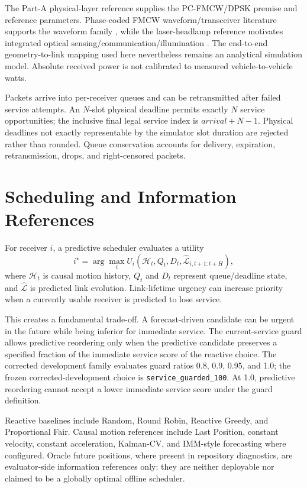 \documentclass[conference]{IEEEtran}
\begin{document}
The Part-A physical-layer reference supplies the PC-FMCW/DPSK premise and reference parameters. Phase-coded FMCW waveform/transceiver literature supports the waveform family \cite{kumbul2023smoothed,kumbul2023mimo}, while the laser-headlamp reference motivates integrated optical sensing/communication/illumination \cite{liu2026laserheadlamp}. The end-to-end geometry-to-link mapping used here nevertheless remains an analytical simulation model. Absolute received power is not calibrated to measured vehicle-to-vehicle watts.

Packets arrive into per-receiver queues and can be retransmitted after failed service attempts. An $N$-slot physical deadline permits exactly $N$ service opportunities; the inclusive final legal service index is $arrival+N-1$. Physical deadlines not exactly representable by the simulator slot duration are rejected rather than rounded. Queue conservation accounts for delivery, expiration, retransmission, drops, and right-censored packets.

\section{Scheduling and Information References}
For receiver $i$, a predictive scheduler evaluates a utility
\begin{equation}
 i^{\star}=\arg\max_i U_i\!\left(\mathcal{H}_t,Q_t,D_t,\widehat{\mathcal{L}}_{i,t+1:t+H}\right),
\end{equation}
where $\mathcal{H}_t$ is causal motion history, $Q_t$ and $D_t$ represent queue/deadline state, and $\widehat{\mathcal{L}}$ is predicted link evolution. Link-lifetime urgency can increase priority when a currently usable receiver is predicted to lose service.

This creates a fundamental trade-off. A forecast-driven candidate can be urgent in the future while being inferior for immediate service. The current-service guard allows predictive reordering only when the predictive candidate preserves a specified fraction of the immediate service score of the reactive choice. The corrected development family evaluates guard ratios 0.8, 0.9, 0.95, and 1.0; the frozen corrected-development choice is \texttt{service\_guarded\_100}. At 1.0, predictive reordering cannot accept a lower immediate service score under the guard definition.

Reactive baselines include Random, Round Robin, Reactive Greedy, and Proportional Fair. Causal motion references include Last Position, constant velocity, constant acceleration, Kalman-CV, and IMM-style forecasting where configured. Oracle future positions, where present in repository diagnostics, are evaluator-side information references only: they are neither deployable nor claimed to be a globally optimal offline scheduler.
\end{document}
